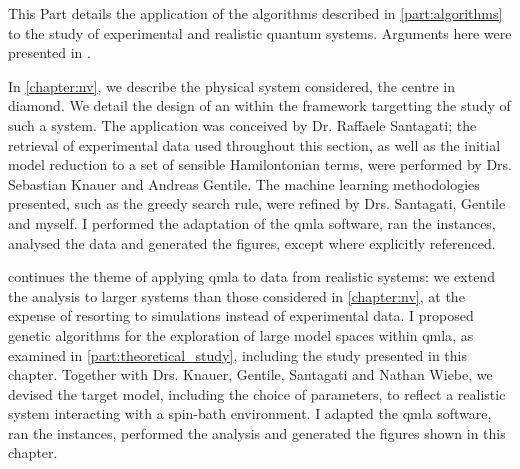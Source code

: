 This Part details the application of the algorithms described in \cref{part:algorithms}
    to the study of experimental and realistic quantum systems.
Arguments here were presented in \cite{gentile2020learning}. 
\par 
\vspace{1cm}

In \cref{chapter:nv}, we describe the physical system considered, 
    the  centre in diamond. 
We detail the design of an  within the  framework
    targetting the study of such a system. 
The application was conceived by Dr. Raffaele Santagati; 
    the retrieval of experimental data used throughout this section, 
    as well as the initial model reduction to a set of sensible Hamilontonian terms,
    were performed by Drs. Sebastian Knauer and Andreas Gentile. 
The machine learning methodologies presented, 
    such as the greedy search rule, were refined by Drs. Santagati, Gentile and myself. 
I performed the adaptation of the \gls{qmla} software, 
    ran the instances, analysed the data and generated the figures, except where explicitly referenced.
\par 
\vspace{1cm}

 continues the theme of applying \gls{qmla} to data from realistic systems: 
    we extend the analysis to larger systems than those considered in \cref{chapter:nv}, 
    at the expense of resorting to simulations instead of experimental data. 
I proposed genetic algorithms for the exploration of large model spaces within \gls{qmla}, 
    as examined in \cref{part:theoretical_study}, including the study presented in this chapter. 
Together with Drs. Knauer, Gentile, Santagati and Nathan Wiebe, we devised the target model, 
    including the choice of parameters, to reflect a realistic system 
    interacting with a spin-bath environment.
I adapted the \gls{qmla} software, ran the instances, performed the analysis and generated the figures 
    shown in this chapter. 


